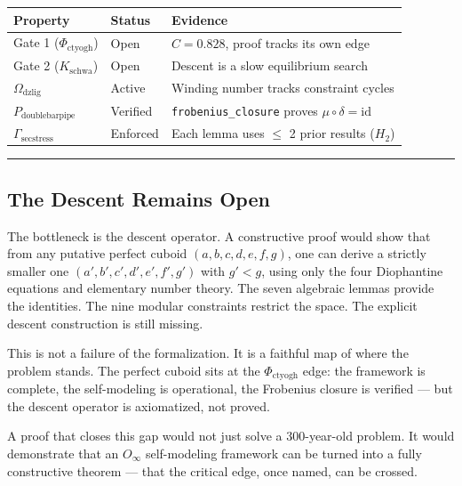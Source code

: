 \documentclass[12pt,a4paper]{article}
\begin{document}
\begin{table}[htbp]
\centering
\small
{}
\begin{tabularx}{\textwidth}{>{\centering\arraybackslash}X >{\centering\arraybackslash}X >{\centering\arraybackslash}X}
\toprule
\rowcolor{gray!25}\textbf{Property} & \textbf{Status} & \textbf{Evidence} \\
\midrule
\rowcolors{1}{white}{gray!10}
Gate 1 ($\Phi_{\text{ctyogh}}$) & Open & $C = 0.828$, proof tracks its own edge \\
Gate 2 ($K_{\text{schwa}}$) & Open & Descent is a slow equilibrium search \\
$\Omega_{\text{dzlig}}$ & Active & Winding number tracks constraint cycles \\
$P_{\text{doublebarpipe}}$ & Verified & \texttt{frobenius\_closure} proves $\mu \circ \delta = \text{id}$ \\
$\Gamma_{\text{secstress}}$ & Enforced & Each lemma uses $\leq$ 2 prior results ($H_2$) \\
\bottomrule
\end{tabularx}
\end{table}

\begin{center}
\rule{0.5\textwidth}{0.4pt}
\end{center}

\subsection{The Descent Remains Open}

The bottleneck is the descent operator. A constructive proof would show that from any putative perfect cuboid $(a, b, c, d, e, f, g)$, one can derive a strictly smaller one $(a', b', c', d', e', f', g')$ with $g' < g$, using only the four Diophantine equations and elementary number theory. The seven algebraic lemmas provide the identities. The nine modular constraints restrict the space. The explicit descent construction is still missing.

This is not a failure of the formalization. It is a faithful map of where the problem stands. The perfect cuboid sits at the $\Phi_{\text{ctyogh}}$ edge: the framework is complete, the self-modeling is operational, the Frobenius closure is verified --- but the descent operator is axiomatized, not proved.

A proof that closes this gap would not just solve a 300-year-old problem. It would demonstrate that an $O_{\infty}$ self-modeling framework can be turned into a fully constructive theorem --- that the critical edge, once named, can be crossed.
\end{document}
